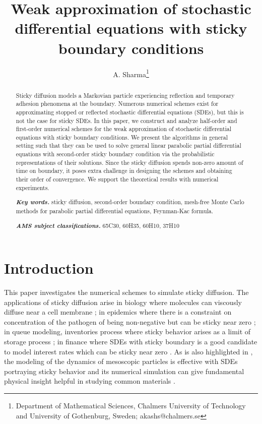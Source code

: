 \documentclass{article}
\title{Weak approximation of stochastic differential equations with sticky boundary conditions }
\author{A. Sharma\thanks{Department of Mathematical Sciences, Chalmers University of Technology and University of Gothenburg, Sweden; akashs@chalmers.se}}
\date{}
\theoremstyle{definition}
\numberwithin{equation}{section}
\providecommand{\keywords}[1]
{
  \small	
  \noindent\textbf{\textit{Key words. }} #1
}
\providecommand{\msc}[1]
{
  \small	
  \noindent\textbf{\textit{AMS subject classifications.}} #1
}
\begin{document}
\maketitle
\begin{abstract}

Sticky diffusion models a Markovian particle experiencing reflection and temporary adhesion phenomena at the boundary. Numerous numerical schemes exist for approximating stopped or reflected stochastic differential equations (SDEs), but this is not the case for sticky SDEs. In this paper, we construct and analyze half-order and first-order numerical schemes for the weak approximation of stochastic differential equations with sticky boundary conditions. We present the algorithms in general setting such that they can  be used  to  solve general linear parabolic partial differential equations with second-order sticky boundary condition via the  probabilistic representations of their solutions. Since the sticky diffusion spends non-zero amount of time on boundary, it poses extra challenge in designing the schemes and obtaining their order of convergence. We support the theoretical results with numerical experiments.  
    
    \bigskip
 \keywords{sticky diffusion, second-order boundary condition, mesh-free Monte Carlo methods for parabolic partial differential equations, Feynman-Kac formula.}
    
    \vspace{8pt}

\msc{ 65C30, 60H35, 60H10, 37H10}  
\end{abstract}
\section{Introduction}

This paper investigates the numerical schemes to simulate sticky diffusion. The applications of sticky diffusion arise in biology where molecules can viscously diffuse near a cell membrane \cite{w19}; in epidemics where there is a constraint on concentration of the pathogen of being non-negative but can be sticky near zero \cite{w20}; in queue modeling, inventories process where sticky behavior arises as a limit of storage process \cite{w21}; in finance where SDEs with sticky boundary is a good candidate to model interest rates which can be sticky near zero \cite{w23,w22}.  As is also highlighted in \cite{nawaf_miranda20}, the modeling  of the dynamics of mesoscopic particles is effective with SDEs portraying sticky behavior and its numerical simulation can give fundamental physical insight helpful in studying common materials \cite{w26,w24,w25,w27, holmes2020simulating_stratification_sticky_particles}.
\end{document}
